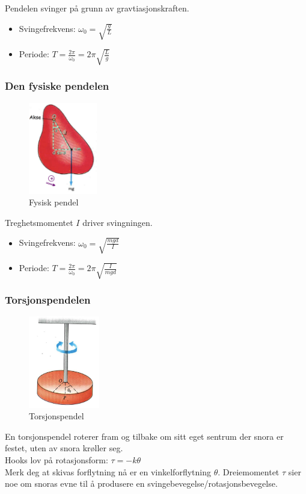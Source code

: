 \documentclass[12pt]{article}
\begin{document}
Pendelen svinger på grunn av gravtiasjonskraften.
\begin{itemize}
    \item[] Svingefrekvens: $\omega_0 = \sqrt{\frac{g}{L}}$
    \item[] Periode: $T = \frac{2\pi}{\omega_0} = 2\pi\sqrt{\frac{L}{g}}$
\end{itemize}

\subsubsection{Den fysiske pendelen}
\begin{figure} [H]
    \centering
    \includegraphics[height = 4cm]{images/physicalPendel.png}
    \caption{Fysisk pendel}
\end{figure}
Treghetsmomentet $I$ driver svingningen.
\begin{itemize}
    \item[] Svingefrekvens: $\omega_0 = \sqrt{\frac{mgd}{I}}$
    \item[] Periode: $T = \frac{2\pi}{\omega_0} = 2\pi\sqrt{\frac{I}{mgd}}$
\end{itemize}
\subsubsection{Torsjonspendelen}
\begin{figure} [H]
    \centering
    \includegraphics[height = 4cm]{images/tortion.png}
    \caption{Torsjonspendel}
\end{figure}
En torsjonspendel roterer fram og tilbake om sitt eget sentrum der snora er festet, uten av snora krøller seg.\\
\bigskip
Hooks lov på rotasjonsform: $\tau = -k\theta$\\
\bigskip
Merk deg at skivas forflytning nå er en vinkelforflytning $\theta$. Dreiemomentet $\tau$ sier noe om snoras evne til å produsere en svingebevegelse/rotasjonsbevegelse.
\end{document}
